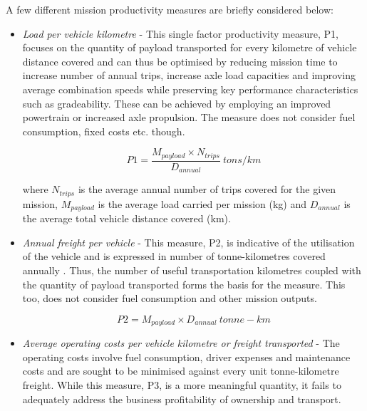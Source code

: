 \documentclass[ExampleMasters.tex]{subfiles}
\begin{document}
		A few different mission productivity measures are briefly considered below:
		\begin{itemize}
			\item \textit{Load per vehicle kilometre} - This single factor productivity measure, P1, focuses on the quantity of payload transported for every kilometre of vehicle distance covered and can thus be optimised by reducing mission time to increase number of annual trips, increase axle load capacities and improving average combination speeds while preserving key performance characteristics such as gradeability. These can be achieved by employing an improved powertrain or increased axle propulsion. The measure does not consider fuel consumption, fixed costs etc. though.

			\begin{equation}
				P1 = \frac{M_{payload} \times N_{trips}}{D_{annual}} \ tons/km
			\end{equation}

			where $N_{trips}$  is the average annual number of trips covered for the given mission, $M_{payload}$  is the average load carried per mission (kg) and $D_{annual}$  is the average total vehicle distance covered (km).

			\item \textit{Annual freight per vehicle} - This measure, P2, is indicative of the utilisation of the vehicle and is expressed in number of tonne-kilometres covered annually \cite{TruckProdAus}. Thus, the number of useful transportation kilometres coupled with the quantity of payload transported forms the basis for the measure. This too, does not consider fuel consumption and other mission outputs.

			\begin{equation}
				P2 = M_{payload} \times D_{annual} \ tonne-km
			\end{equation}

			\item \textit{Average operating costs per vehicle kilometre or freight transported} - The operating costs involve fuel consumption, driver expenses and maintenance costs and are sought to be minimised against every unit tonne-kilometre freight. While this measure, P3, is a more meaningful quantity, it fails to adequately address the business profitability of ownership and transport.


\end{itemize}
\end{document}

